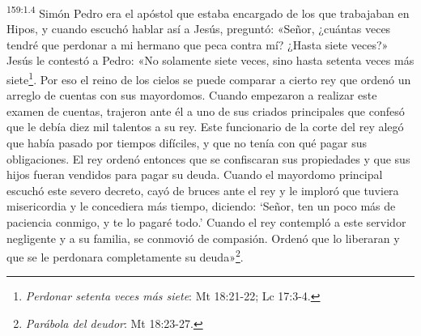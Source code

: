 \par 
\textsuperscript{159:1.4} Simón Pedro era el apóstol que estaba encargado de los que trabajaban en Hipos, y cuando escuchó hablar así a Jesús, preguntó: «Señor, ¿cuántas veces tendré que perdonar a mi hermano que peca contra mí? ¿Hasta siete veces?» Jesús le contestó a Pedro: «No solamente siete veces, sino hasta setenta veces más siete\footnote{\textit{Perdonar setenta veces más siete}: Mt 18:21-22; Lc 17:3-4.}. Por eso el reino de los cielos se puede comparar a cierto rey que ordenó un arreglo de cuentas con sus mayordomos. Cuando empezaron a realizar este examen de cuentas, trajeron ante él a uno de sus criados principales que confesó que le debía diez mil talentos a su rey. Este funcionario de la corte del rey alegó que había pasado por tiempos difíciles, y que no tenía con qué pagar sus obligaciones. El rey ordenó entonces que se confiscaran sus propiedades y que sus hijos fueran vendidos para pagar su deuda. Cuando el mayordomo principal escuchó este severo decreto, cayó de bruces ante el rey y le imploró que tuviera misericordia y le concediera más tiempo, diciendo: `Señor, ten un poco más de paciencia conmigo, y te lo pagaré todo.' Cuando el rey contempló a este servidor negligente y a su familia, se conmovió de compasión. Ordenó que lo liberaran y que se le perdonara completamente su deuda»\footnote{\textit{Parábola del deudor}: Mt 18:23-27.}.

